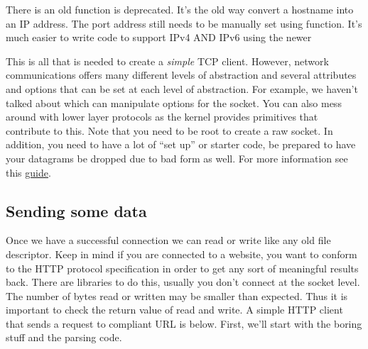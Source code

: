 There is an old function  is deprecated.
It's the old way convert a hostname into an IP address.
The port address still needs to be manually set using  function.
It's much easier to write code to support IPv4 AND IPv6 using the newer 

This is all that is needed to create a \textit{simple} TCP client. However, network communications offers many different levels of abstraction and several attributes and options that can be set at each level of abstraction.
For example, we haven't talked about  which can manipulate options for the socket.
You can also mess around with lower layer protocols as the kernel provides primitives that contribute to this.
Note that you need to be root to create a raw socket.
In addition, you need to have a lot of ``set up'' or starter code, be prepared to have your datagrams be dropped due to bad form as well.
For more information see this \href{http://www.beej.us/guide/bgnet/output/html/multipage/getaddrinfoman.html}{guide}.

\subsection{Sending some data}

Once we have a successful connection we can read or write like any old file descriptor.
Keep in mind if you are connected to a website, you want to conform to the HTTP protocol specification in order to get any sort of meaningful results back.
There are libraries to do this, usually you don't connect at the socket level.
The number of bytes read or written may be smaller than expected.
Thus it is important to check the return value of read and write.
A simple HTTP client that sends a request to compliant URL is below.
First, we'll start with the boring stuff and the parsing code.

